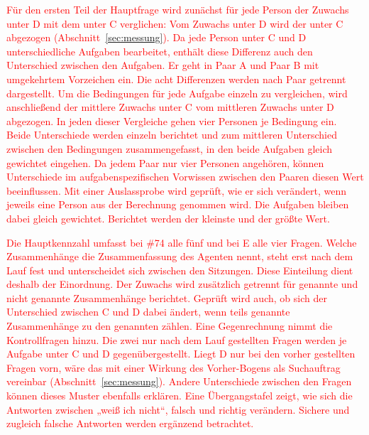 \textcolor{red}{Für den ersten Teil der Hauptfrage wird zunächst für jede Person der Zuwachs unter D mit dem unter C verglichen: Vom Zuwachs unter D wird der unter C abgezogen (Abschnitt~\ref{sec:messung}). Da jede Person unter C und D unterschiedliche Aufgaben bearbeitet, enthält diese Differenz auch den Unterschied zwischen den Aufgaben. Er geht in Paar A und Paar B mit umgekehrtem Vorzeichen ein. Die acht Differenzen werden nach Paar getrennt dargestellt. Um die Bedingungen für jede Aufgabe einzeln zu vergleichen, wird anschließend der mittlere Zuwachs unter C vom mittleren Zuwachs unter D abgezogen. In jeden dieser Vergleiche gehen vier Personen je Bedingung ein. Beide Unterschiede werden einzeln berichtet und zum mittleren Unterschied zwischen den Bedingungen zusammengefasst, in den beide Aufgaben gleich gewichtet eingehen. Da jedem Paar nur vier Personen angehören, können Unterschiede im aufgabenspezifischen Vorwissen zwischen den Paaren diesen Wert beeinflussen. Mit einer Auslassprobe wird geprüft, wie er sich verändert, wenn jeweils eine Person aus der Berechnung genommen wird. Die Aufgaben bleiben dabei gleich gewichtet. Berichtet werden der kleinste und der größte Wert.}

\textcolor{red}{Die Hauptkennzahl umfasst bei \#74 alle fünf und bei E alle vier Fragen. Welche Zusammenhänge die Zusammenfassung des Agenten nennt, steht erst nach dem Lauf fest und unterscheidet sich zwischen den Sitzungen. Diese Einteilung dient deshalb der Einordnung. Der Zuwachs wird zusätzlich getrennt für genannte und nicht genannte Zusammenhänge berichtet. Geprüft wird auch, ob sich der Unterschied zwischen C und D dabei ändert, wenn teils genannte Zusammenhänge zu den genannten zählen. Eine Gegenrechnung nimmt die Kontrollfragen hinzu. Die zwei nur nach dem Lauf gestellten Fragen werden je Aufgabe unter C und D gegenübergestellt. Liegt D nur bei den vorher gestellten Fragen vorn, wäre das mit einer Wirkung des Vorher-Bogens als Suchauftrag vereinbar (Abschnitt~\ref{sec:messung}). Andere Unterschiede zwischen den Fragen können dieses Muster ebenfalls erklären. Eine Übergangstafel zeigt, wie sich die Antworten zwischen „weiß ich nicht“, falsch und richtig verändern. Sichere und zugleich falsche Antworten werden ergänzend betrachtet.}

